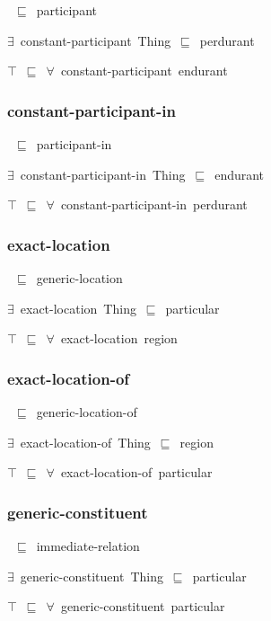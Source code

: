 \documentclass{article}
\begin{document}
~\ensuremath{\sqsubseteq}~participant

\ensuremath{\exists}~constant-participant~Thing~\ensuremath{\sqsubseteq}~perdurant

\ensuremath{\top}~\ensuremath{\sqsubseteq}~\ensuremath{\forall}~constant-participant~endurant

\subsubsection*{constant-participant-in}

~\ensuremath{\sqsubseteq}~participant-in

\ensuremath{\exists}~constant-participant-in~Thing~\ensuremath{\sqsubseteq}~endurant

\ensuremath{\top}~\ensuremath{\sqsubseteq}~\ensuremath{\forall}~constant-participant-in~perdurant

\subsubsection*{exact-location}

~\ensuremath{\sqsubseteq}~generic-location

\ensuremath{\exists}~exact-location~Thing~\ensuremath{\sqsubseteq}~particular

\ensuremath{\top}~\ensuremath{\sqsubseteq}~\ensuremath{\forall}~exact-location~region

\subsubsection*{exact-location-of}

~\ensuremath{\sqsubseteq}~generic-location-of

\ensuremath{\exists}~exact-location-of~Thing~\ensuremath{\sqsubseteq}~region

\ensuremath{\top}~\ensuremath{\sqsubseteq}~\ensuremath{\forall}~exact-location-of~particular

\subsubsection*{generic-constituent}

~\ensuremath{\sqsubseteq}~immediate-relation

\ensuremath{\exists}~generic-constituent~Thing~\ensuremath{\sqsubseteq}~particular

\ensuremath{\top}~\ensuremath{\sqsubseteq}~\ensuremath{\forall}~generic-constituent~particular
\end{document}
